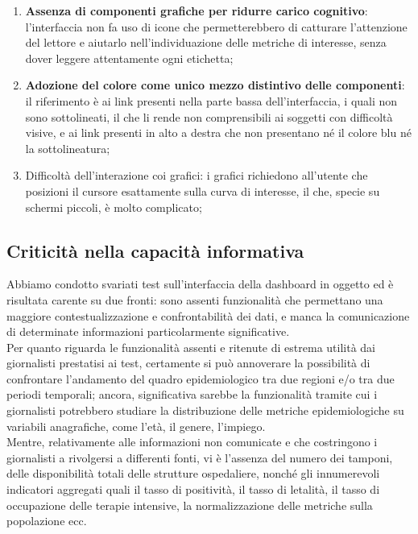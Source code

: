 \documentclass[../../main.tex]{subfiles}
\begin{document}
\begin{enumerate}
    \item \textbf{Assenza di componenti grafiche per ridurre carico cognitivo}: l'interfaccia non fa uso di icone che permetterebbero di catturare l'attenzione del lettore e aiutarlo nell'individuazione delle metriche di interesse, senza dover leggere attentamente ogni etichetta;\label{el:7}
    \item \textbf{Adozione del colore come unico mezzo distintivo delle componenti}: il riferimento è ai link presenti nella parte bassa dell'interfaccia, i quali non sono sottolineati, il che li rende non comprensibili ai soggetti con difficoltà visive, e ai link presenti in alto a destra che non presentano né il colore blu né la sottolineatura;\label{el:8}
    \item Difficoltà dell'interazione coi grafici: i grafici richiedono all'utente che posizioni il cursore esattamente sulla curva di interesse, il che, specie su schermi piccoli, è molto complicato;\label{el:9}
\end{enumerate}

\subsection{Criticità nella capacità informativa}
\label{ss:criticita-informative}
Abbiamo condotto svariati test sull'interfaccia della dashboard in oggetto ed è risultata carente su due fronti: sono assenti funzionalità che permettano una maggiore contestualizzazione e confrontabilità dei dati, e manca la comunicazione di determinate informazioni particolarmente significative.\\
Per quanto riguarda le funzionalità assenti e ritenute di estrema utilità dai giornalisti prestatisi ai test, certamente si può annoverare la possibilità di confrontare l'andamento del quadro epidemiologico tra due regioni e/o tra due periodi temporali; ancora, significativa sarebbe la funzionalità tramite cui i giornalisti potrebbero studiare la distribuzione delle metriche epidemiologiche su variabili anagrafiche, come l'età, il genere, l'impiego.\\
Mentre, relativamente alle informazioni non comunicate e che costringono i giornalisti a rivolgersi a differenti fonti, vi è l'assenza del numero dei tamponi, delle disponibilità totali delle strutture ospedaliere, nonché gli innumerevoli indicatori aggregati quali il tasso di positività, il tasso di letalità, il tasso di occupazione delle terapie intensive, la normalizzazione delle metriche sulla popolazione ecc.
\end{document}
